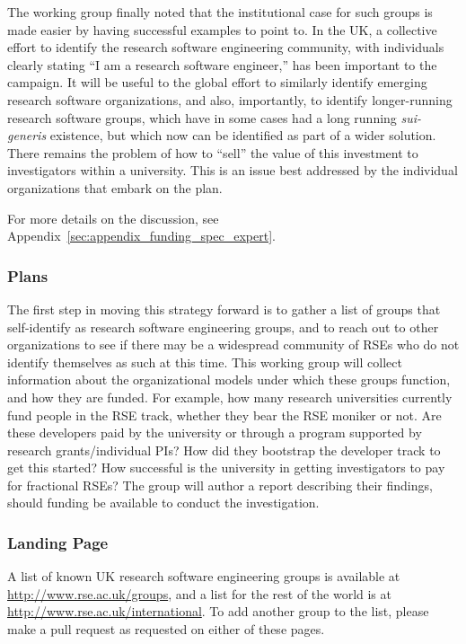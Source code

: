The working group finally noted that the institutional case for such groups is made easier by
having successful examples to point to. In the UK, a collective effort to
identify the research software engineering community, with individuals clearly
stating ``I am a research software engineer,'' has been important to the
campaign. It will be useful to the global effort to similarly identify emerging
research software organizations, and also, importantly, to identify
longer-running research software groups, which have in some cases had a long
running \emph{sui-generis} existence, but which now can be identified as part of
a wider solution. There remains the problem of how to ``sell'' the value of this
investment to investigators within a university. This is an issue best addressed
by the individual organizations that embark on the plan.

For more details on the discussion, see
Appendix~\ref{sec:appendix_funding_spec_expert}.

\subsubsection{Plans}

The first step in moving this strategy forward is to gather a list of groups
that self-identify as research software engineering groups, and to reach out to
other organizations to see if there may be a widespread community of RSEs who do
not identify themselves as such at this time. This working group will collect information about
the organizational models under which these groups function, and how they are
funded. For example, how many research universities currently fund people in the
RSE track, whether they bear the RSE moniker or not. Are these developers paid
by the university or through a program supported by research grants/individual
PIs? How did they bootstrap the developer track to get this started? How
successful is the university in getting investigators to pay for fractional
RSEs? The group will author a report describing their findings, should funding be
available to conduct the investigation.

\subsubsection{Landing Page}

A list of known UK research software engineering groups is available at  
\url{http://www.rse.ac.uk/groups}, and a list for the rest of the world
is at \url{http://www.rse.ac.uk/international}.
To add another group to the list, please make a pull request as requested
on either of these pages.
